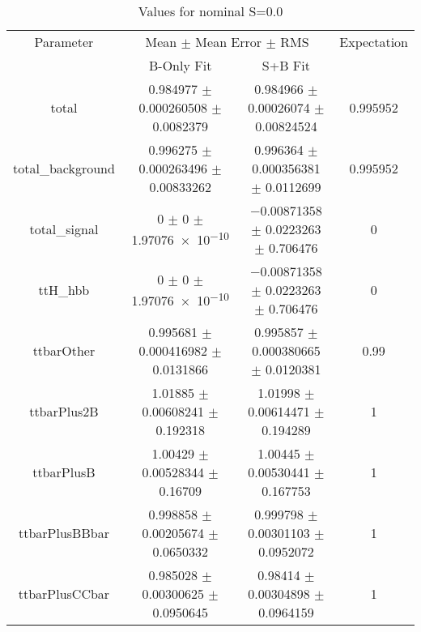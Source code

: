 \begin{table}
\centering
\caption{Values for nominal S=0.0}
\begin{tabular}{cccc}
\toprule
Parameter & \multicolumn{2}{c}{Mean $\pm$ Mean Error $\pm$ RMS} & Expectation\\
 & B-Only Fit & S+B Fit & \\
\midrule
total & \num{0.984977} $\pm$ \num{0.000260508} $\pm$ \num{0.0082379} & \num{0.984966} $\pm$ \num{0.00026074} $\pm$ \num{0.00824524} & \num{0.995952}\\
total\_background & \num{0.996275} $\pm$ \num{0.000263496} $\pm$ \num{0.00833262} & \num{0.996364} $\pm$ \num{0.000356381} $\pm$ \num{0.0112699} & \num{0.995952}\\
total\_signal & \num{0} $\pm$ \num{0} $\pm$ \num{1.97076e-10} & \num{-0.00871358} $\pm$ \num{0.0223263} $\pm$ \num{0.706476} & \num{0}\\
ttH\_hbb & \num{0} $\pm$ \num{0} $\pm$ \num{1.97076e-10} & \num{-0.00871358} $\pm$ \num{0.0223263} $\pm$ \num{0.706476} & \num{0}\\
ttbarOther & \num{0.995681} $\pm$ \num{0.000416982} $\pm$ \num{0.0131866} & \num{0.995857} $\pm$ \num{0.000380665} $\pm$ \num{0.0120381} & \num{0.99}\\
ttbarPlus2B & \num{1.01885} $\pm$ \num{0.00608241} $\pm$ \num{0.192318} & \num{1.01998} $\pm$ \num{0.00614471} $\pm$ \num{0.194289} & \num{1}\\
ttbarPlusB & \num{1.00429} $\pm$ \num{0.00528344} $\pm$ \num{0.16709} & \num{1.00445} $\pm$ \num{0.00530441} $\pm$ \num{0.167753} & \num{1}\\
ttbarPlusBBbar & \num{0.998858} $\pm$ \num{0.00205674} $\pm$ \num{0.0650332} & \num{0.999798} $\pm$ \num{0.00301103} $\pm$ \num{0.0952072} & \num{1}\\
ttbarPlusCCbar & \num{0.985028} $\pm$ \num{0.00300625} $\pm$ \num{0.0950645} & \num{0.98414} $\pm$ \num{0.00304898} $\pm$ \num{0.0964159} & \num{1}\\
\bottomrule
\end{tabular}
\end{table}